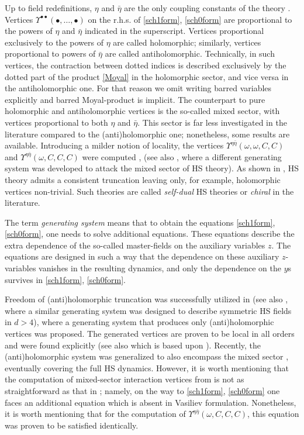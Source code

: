 \documentclass[12pt]{article}
\newcommand{\go}{\omega}
\begin{document}
Up to field redefinitions, $\eta$ and $\bar{\eta}$ are the only coupling constants of the theory \cite{Vasiliev:1990en}. Vertices 
$\Upsilon^{\bullet\bullet}(\bullet,\ldots,\bullet)$ on the r.h.s. of \eqref{sch1form}, \eqref{sch0form} are proportional to the powers of 
$\eta$ and $\bar{\eta}$ indicated in the superscript. Vertices proportional exclusively to the powers of $\eta$ are called holomorphic; similarly, vertices proportional to powers of $\bar{\eta}$ are called antiholomorphic. Technically, in such vertices, the contraction between dotted indices is described exclusively by the dotted part of the product \eqref{Moyal} in the holomorphic sector, and vice versa in the antiholomorphic one. For that reason we omit writing barred variables explicitly and barred Moyal-product is implicit. The counterpart to pure holomorphic and antiholomorphic vertices is the so-called mixed sector, with vertices proportional to both $\eta$ and $\bar{\eta}$. This sector is far less investigated in the literature compared to the (anti)holomorphic one; nonetheless, some results are available. Introducing a milder notion of locality, the vertices $\Upsilon^{\eta\bar{\eta}}(\go,\go,C,C)$ and $\Upsilon^{\eta\bar{\eta}}(\go,C,C,C)$ were computed \cite{Didenko:2019xzz}, \cite{Gelfond:2023fwe} (see also \cite{Didenko:2026nag}, where a different generating system was developed to attack the mixed sector of HS theory). As shown in \cite{Vasiliev:1992av}, HS theory admits a consistent truncation leaving only, for example, holomorphic vertices non-trivial. Such theories are called {\it self-dual} HS theories or {\it chiral} in the literature.
 
 
The term {\it generating system} means that to obtain the equations \eqref{sch1form}, \eqref{sch0form}, one needs to solve additional equations. These equations describe the extra dependence of the so-called master-fields on the auxiliary variables $z$. The equations are designed in such a way that the dependence on these auxiliary $z$-variables vanishes in the resulting dynamics, and only the dependence on the $y$s survives in \eqref{sch1form}, \eqref{sch0form}.

Freedom of (anti)holomorphic truncation was successfully utilized in \cite{Didenko:2022qga} (see also \cite{Didenko:2023vna}, where a similar generating system was designed to describe symmetric HS fields in 
$d>4$), where a generating system that produces only (anti)holomorphic vertices was proposed. The generated vertices are proven to be local in all orders and were found explicitly \cite{Didenko:2024zpd} (see also \cite{Sharapov:2022nps} which is based upon \cite{Ponomarev:2016lrm}). Recently, the (anti)holomorphic system was generalized to also encompass the mixed sector \cite{Didenko:2026nag}, eventually covering the full HS dynamics. However, it is worth mentioning that the computation of mixed-sector interaction vertices from \cite{Didenko:2026nag} is not as straightforward as that in \cite{Vasiliev:1992av}; namely, on the way  to \eqref{sch1form},  \eqref{sch0form} one faces an additional equation which is absent in Vasiliev formulation. Nonetheless, it is worth mentioning that for the computation of $\Upsilon^{\eta\bar{\eta}}(\go,C,C,C)$, this equation was proven to be satisfied identically.
\end{document}
